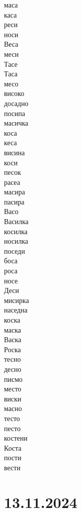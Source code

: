 \documentclass[a5paper,12pt]{article}
\newenvironment{activity}[1]{%
  \begin{tcolorbox}[colback=boxcolor,colframe=titlecolor,title={\textbf{#1}},fonttitle=\bfseries]
}{%
  \end{tcolorbox}
}
\begin{document}
\begin{activity}{Зборчиња}
\begin{multicols}{4}
маса\\ каса\\ реси\\ носи\\ Веса\\ меси\\ Тасе\\ Таса\\ месо\\ високо\\ досадно\\ посипа\\ масичка\\ коса\\ кеса\\ висина\\ коси\\ песок\\ расеа\\
масира\\ пасира\\ Васо\\ Василка\\ косилка\\ носилка\\ поседи\\ боса\\ роса\\ носе\\ Деси\\ мисирка\\ наседна\\
коска\\ маска\\ Васка\\ Роска\\ тесно\\ десно\\ писмо\\ место\\ виски\\ масно\\ тесто\\ песто\\ костени\\ Коста\\ пости\\ вести
\end{multicols}
\end{activity}

\section{13.11.2024} 
\end{document}
